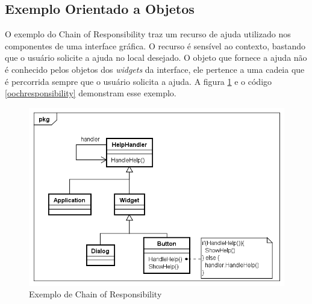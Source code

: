 \subsection*{Exemplo Orientado a Objetos}

O exemplo do Chain of Responsibility traz um recurso 
de ajuda utilizado nos componentes de uma 
interface gráfica. O recurso é sensível ao contexto, 
bastando que o usuário solicite a ajuda no local 
desejado. O objeto que fornece a ajuda não é 
conhecido pelos objetos dos \textit{widgets} da 
interface, ele pertence a uma cadeia que é 
percorrida sempre que o usuário solicita 
a ajuda. A figura \ref{chain_exemplo} e o código 
\ref{oochresponsibility} demonstram esse exemplo.

\begin{figure}[htb]
	\caption{\label{chain_exemplo}Exemplo de Chain of Responsibility}
	\begin{center}
	    \includegraphics[scale=0.5]{5_padroes-contexto-funcional/5.3_comportamentais/5.3.01_chain-of-responsibility/chainofresponsibility_exemplo.png}
	\end{center}
\end{figure}

